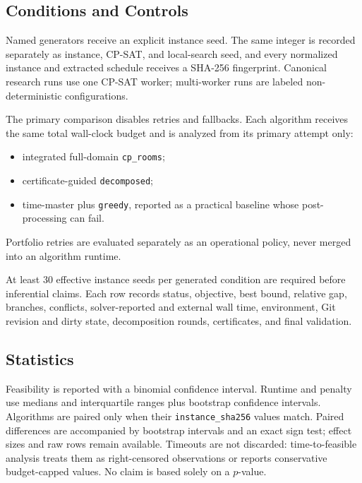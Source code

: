 \subsection{Conditions and Controls}
Named generators receive an explicit instance seed.
The same integer is recorded separately as instance, CP-SAT, and local-search seed, and every normalized instance and extracted schedule receives a SHA-256 fingerprint.
Canonical research runs use one CP-SAT worker; multi-worker runs are labeled non-deterministic configurations.

The primary comparison disables retries and fallbacks.
Each algorithm receives the same total wall-clock budget and is analyzed from its primary attempt only:
\begin{itemize}[leftmargin=*]
  \item integrated full-domain \texttt{cp\_rooms};
  \item certificate-guided \texttt{decomposed};
  \item time-master plus \texttt{greedy}, reported as a practical baseline whose post-processing can fail.
\end{itemize}
Portfolio retries are evaluated separately as an operational policy, never merged into an algorithm runtime.

At least 30 effective instance seeds per generated condition are required before inferential claims.
Each row records status, objective, best bound, relative gap, branches, conflicts, solver-reported and external wall time, environment, Git revision and dirty state, decomposition rounds, certificates, and final validation.

\subsection{Statistics}
Feasibility is reported with a binomial confidence interval.
Runtime and penalty use medians and interquartile ranges plus bootstrap confidence intervals.
Algorithms are paired only when their \texttt{instance\_sha256} values match.
Paired differences are accompanied by bootstrap intervals and an exact sign test; effect sizes and raw rows remain available.
Timeouts are not discarded: time-to-feasible analysis treats them as right-censored observations or reports conservative budget-capped values.
No claim is based solely on a $p$-value.

